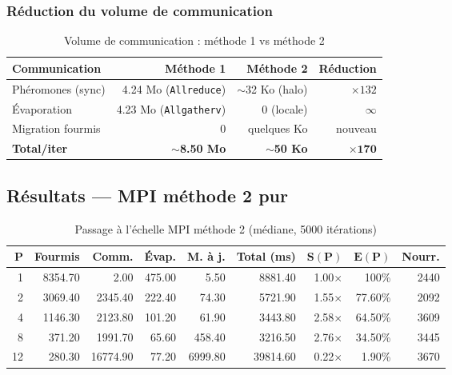 \documentclass[11pt,a4paper]{article}
\begin{document}
\subsubsection{Réduction du volume de communication}

\begin{table}[H]
\centering
\begin{tabular}{lrrr}
\toprule
\textbf{Communication} & \textbf{Méthode 1} & \textbf{Méthode 2} & \textbf{Réduction} \\
\midrule
Phéromones (sync)    & 4.24 Mo (\texttt{Allreduce})   & $\sim$32 Ko (halo)    & $\times 132$ \\
Évaporation          & 4.23 Mo (\texttt{Allgatherv})   & 0 (locale)            & $\infty$    \\
Migration fourmis    & 0                               & quelques Ko            & nouveau     \\
\midrule
\textbf{Total/iter}  & \textbf{$\sim$8.50 Mo}          & \textbf{$\sim$50 Ko}  & $\boldsymbol{\times 170}$ \\
\bottomrule
\end{tabular}
\caption{Volume de communication : méthode 1 vs méthode 2}
\label{tab:comm_volume}
\end{table}

\subsection{Résultats --- MPI méthode 2 pur}

\begin{table}[H]
\centering
\begin{tabular}{rrrrrrrrr}
\toprule
$\boldsymbol{P}$ & \textbf{Fourmis} & \textbf{Comm.} & \textbf{Évap.} & \textbf{M. à j.} & \textbf{Total (ms)} & $\boldsymbol{S(P)}$ & $\boldsymbol{E(P)}$ & \textbf{Nourr.} \\
\midrule
1  & 8354.70  & 2.00      & 475.00   & 5.50    & 8881.40  & 1.00$\times$ & 100\%  & 2440 \\
2  & 3069.40  & 2345.40   & 222.40   & 74.30   & 5721.90  & 1.55$\times$ & 77.60\% & 2092 \\
4  & 1146.30  & 2123.80   & 101.20   & 61.90   & 3443.80  & 2.58$\times$ & 64.50\% & 3609 \\
8  & 371.20   & 1991.70   & 65.60    & 458.40  & 3216.50  & 2.76$\times$ & 34.50\% & 3445 \\
12 & 280.30   & 16774.90  & 77.20    & 6999.80 & 39814.60 & 0.22$\times$ & 1.90\%  & 3670 \\
\bottomrule
\end{tabular}
\caption{Passage à l'échelle MPI méthode 2 (médiane, 5000 itérations)}
\label{tab:mpi2}
\end{table}
\end{document}
